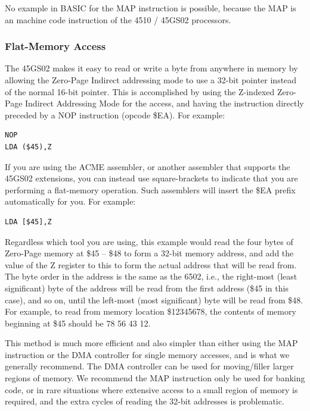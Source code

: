 No example in BASIC for the MAP instruction is possible, because the MAP is an machine code instruction of the 4510 / 45GS02 processors.

\subsubsection{Flat-Memory Access}

The 45GS02 makes it easy to read or write a byte from anywhere in memory by allowing the Zero-Page Indirect
addressing mode to use a 32-bit pointer instead of the normal 16-bit pointer.  This is accomplished by
using the Z-indexed Zero-Page Indirect Addressing Mode for the access, and having the instruction directly
preceded by a NOP instruction (opcode \$EA).  For example:

\begin{tcolorbox}[colback=black,coltext=white]
\verbatimfont{\codefont}
\begin{verbatim}
NOP
LDA ($45),Z
\end{verbatim}
\end{tcolorbox}

If you are using the ACME assembler, or another assembler that supports the 45GS02 extensions, you can instead use square-brackets
to indicate that you are performing a flat-memory operation. Such assemblers will insert the \$EA prefix automatically for you. For example:

\begin{tcolorbox}[colback=black,coltext=white]
\verbatimfont{\codefont}
\begin{verbatim}
LDA [$45],Z
\end{verbatim}
\end{tcolorbox}

Regardless which tool you are using, this example would read the four bytes of Zero-Page memory at \$45 -- \$48 to form a 32-bit memory address, and add the value of the
Z register to this to form the actual address that will be read from.  The byte order in the address is the same as
the 6502, i.e., the right-most (least significant) byte of the address will be read from the first address (\$45 in this case),
and so on, until the left-most (most significant) byte will be read from \$48.  For example, to read from memory location
\$12345678, the contents of memory beginning at \$45 should be 78 56 43 12.

This method is much more efficient and also simpler than either using the MAP instruction or the DMA controller for single memory accesses,
and is what we generally recommend.  The DMA controller can be used for moving/filler larger regions of memory.
We recommend the MAP instruction only be used for banking code, or in rare situations where extensive access to a small region of
memory is required, and the extra cycles of reading the 32-bit addresses is problematic.


